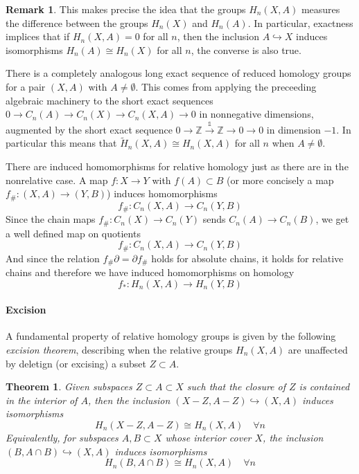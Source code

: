 \documentclass[11pt,a4paper]{article}
\theoremstyle{definition}
\newtheorem{remark}[definition]{Remark}
\theoremstyle{plain}
\newtheorem{theorem}[definition]{Theorem}
\theoremstyle{remark}
\begin{document}
\begin{remark}
This makes precise the idea that the groups $H_n(X,A)$ measures the difference between the groups $H_n(X)$ and 
$H_n(A)$. In particular, exactness implices that if $H_n(X,A) = 0$ for all $n$, then the inclusion $A \hookrightarrow X$ induces 
isomorphisms $H_n(A) \cong H_n(X)$ for all $n$, the converse is also true. 

There is a completely analogous long exact sequence of reduced homology groups for a pair $(X,A)$ with $A \neq \emptyset$. 
This comes from applying the preceeding algebraic machinery to the short exact sequences 
$0 \to C_n(A) \to C_n(X) \to C_n(X,A) \to 0$ in nonnegative dimensions, augmented by the short exact sequence 
$0 \to \mathbb{Z} \xrightarrow{\mathbb{1}} \mathbb{Z} \to 0 \to 0$ in dimension $-1$. In particular this means that 
$\tilde{H}_n(X,A) \cong H_n (X,A)$ for all $n$ when $A \neq \emptyset$. 

There are induced homomorphisms for relative homology just as there are in the nonrelative case. A map $f \colon X \to Y$ with 
$f(A) \subset B$ (or more concisely a map $f_\# \colon (X, A) \to (Y, B)$) induces homomorphisms 
$$f_\# \colon C_n(X,A) \to C_n(Y,B)$$ 
Since the chain maps $f_\# \colon C_n(X) \to C_n(Y)$ sends $C_n(A) \to C_n (B)$, we get a well defined map on quotients 
$$f_\# \colon C_n(X,A) \to C_n(Y,B)$$
And since the relation $f_\# \partial = \partial f_\#$ holds for absolute chains, it holds for relative chains and therefore we 
have induced homomorphisms on homology 
$$f_* \colon H_n(X, A) \to H_n(Y,B)$$

\paragraph{Excision} 
A fundamental property of relative homology groups is given by the following \emph{excision theorem}, describing when the relative groups 
$H_n(X,A)$ are unaffected by deletign (or excising) a subset $Z \subset A$. 

\begin{theorem}
  Given subspaces $Z \subset A \subset X$ such that the closure of $Z$ is contained in the interior of $A$, 
  then the inclusion $(X- Z, A - Z) \hookrightarrow (X, A)$ induces isomorphisms 
  $$H_n(X - Z, A - Z) \cong H_n(X,A) \quad \forall n$$
  Equivalently, for subspaces $A, B \subset X$ whose interior cover $X$, the inclusion 
  $(B, A \cap B) \hookrightarrow (X, A)$ induces isomorphisms 
  $$H_n (B, A \cap B) \cong H_n(X, A) \quad \forall n$$
\end{theorem}


\end{remark}
\end{document}
